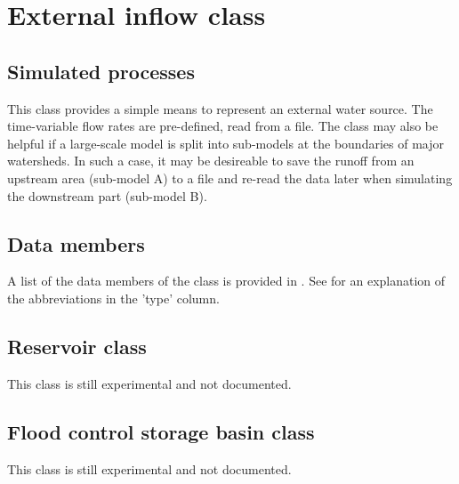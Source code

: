 \section{External inflow class} \label{sec:classes:catchmod:ext-inflow}

\subsection{Simulated processes} \label{sec:classes:catchmod:ext-inflow:processes}
This class provides a simple means to represent an external water source. The time-variable flow rates are pre-defined, \ie{} read from a file. The class may also be helpful if a large-scale model is split into sub-models at the boundaries of major watersheds. In such a case, it may be desireable to save the runoff from an upstream area (sub-model A) to a file and re-read the data later when simulating the downstream part (sub-model B).

\subsection{Data members} \label{sec:classes:catchmod:ext-inflow:members}
A list of the data members of the class is provided in . See \citet{Echse-Main-Doc} for an explanation of the abbreviations in the 'type' column.



\subsection{Reservoir class}
This class is still experimental and not documented.


\subsection{Flood control storage basin class}
This class is still experimental and not documented.
